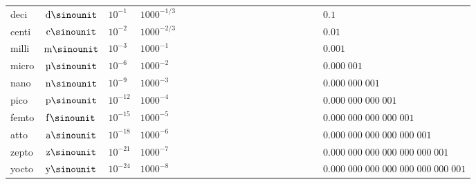 \begin{tabular}{|l|c|l|l|l|}
    deci  & $\si{\deci\sinounit } $ & ${10}^{ -1}$ & ${1000}^{-1/3}$
          & $\phantom{0\;000\;000\;000\;000\;000\;000\;000\;00} 0.1$ \\ \cline{5-5}
    centi & $\si{\centi\sinounit} $ & ${10}^{ -2}$ & ${1000}^{-2/3}$
          & $\phantom{0\;000\;000\;000\;000\;000\;000\;000\;00} 0.01$ \\ \hline
    milli & $\si{\milli\sinounit} $ & ${10}^{ -3}$ & ${1000}^{-1  }$
          & $\phantom{0\;000\;000\;000\;000\;000\;000\;000\;00} 0.001$ \\ \cline{5-5}
    micro & $\si{\micro\sinounit} $ & ${10}^{ -6}$ & ${1000}^{-2  }$
          & $\phantom{0\;000\;000\;000\;000\;000\;000\;000\;00} 0.000\;001$ \\ \cline{5-5}
    nano  & $\si{\nano\sinounit } $ & ${10}^{ -9}$ & ${1000}^{-3  }$
          & $\phantom{0\;000\;000\;000\;000\;000\;000\;000\;00} 0.000\;000\;001$ \\ \cline{5-5}
    pico  & $\si{\pico\sinounit } $ & ${10}^{-12}$ & ${1000}^{-4  }$
          & $\phantom{0\;000\;000\;000\;000\;000\;000\;000\;00} 0.000\;000\;000\;001$ \\ \cline{5-5}
    femto & $\si{\femto\sinounit} $ & ${10}^{-15}$ & ${1000}^{-5  }$
          & $\phantom{0\;000\;000\;000\;000\;000\;000\;000\;00} 0.000\;000\;000\;000\;001$ \\ \cline{5-5}
    atto  & $\si{\atto\sinounit } $ & ${10}^{-18}$ & ${1000}^{-6  }$
          & $\phantom{0\;000\;000\;000\;000\;000\;000\;000\;00} 0.000\;000\;000\;000\;000\;001$ \\ \cline{5-5}
    zepto & $\si{\zepto\sinounit} $ & ${10}^{-21}$ & ${1000}^{-7  }$
          & $\phantom{0\;000\;000\;000\;000\;000\;000\;000\;00} 0.000\;000\;000\;000\;000\;000\;001$ \\ \cline{5-5}
    yocto & $\si{\yocto\sinounit} $ & ${10}^{-24}$ & ${1000}^{-8  }$
          & $\phantom{0\;000\;000\;000\;000\;000\;000\;000\;00} 0.000\;000\;000\;000\;000\;000\;000\;001$ \\
    \hline
\end{tabular}


